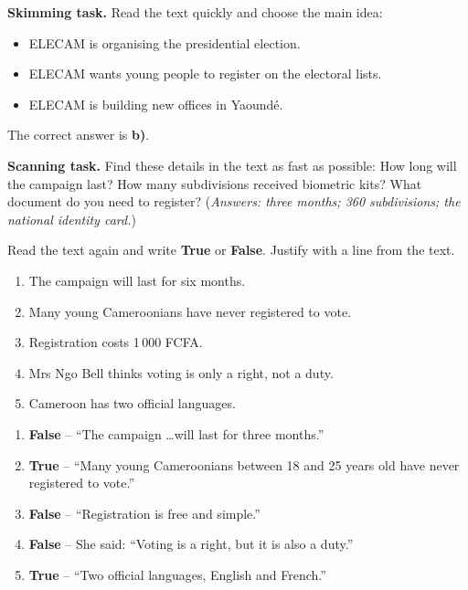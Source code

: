 \documentclass[11pt]{article}
\newcounter{popsec}
\newcounter{popsub}
\newcommand{\courssub}[1]{%
  \stepcounter{popsub}%
  \par\vspace{9pt}\noindent{\popxbold\fontsize{11.5}{13}\selectfont\color{popink}{\color{poporange}\thepopsec.\thepopsub}\hspace{6pt}#1}\par\nopagebreak\vspace{4pt}
}
\begin{document}
\textbf{Skimming task.} Read the text quickly and choose the main idea:
\begin{itemize}
\item[a)] ELECAM is organising the presidential election.
\item[b)] ELECAM wants young people to register on the electoral lists.
\item[c)] ELECAM is building new offices in Yaoundé.
\end{itemize}
The correct answer is \textbf{b)}.

\textbf{Scanning task.} Find these details in the text as fast as possible: How long will the campaign last? How many subdivisions received biometric kits? What document do you need to register? (\emph{Answers: three months; 360 subdivisions; the national identity card.})

\courssub{Comprehension Tasks}

\begin{exercice}
Read the text again and write \textbf{True} or \textbf{False}. Justify with a line from the text.
\begin{enumerate}
\item The campaign will last for six months.
\item Many young Cameroonians have never registered to vote.
\item Registration costs 1\,000 FCFA.
\item Mrs Ngo Bell thinks voting is only a right, not a duty.
\item Cameroon has two official languages.
\end{enumerate}
\end{exercice}

\begin{corrige}
\begin{enumerate}
\item \textbf{False} -- ``The campaign \ldots will last for three months.''
\item \textbf{True} -- ``Many young Cameroonians between 18 and 25 years old have never registered to vote.''
\item \textbf{False} -- ``Registration is free and simple.''
\item \textbf{False} -- She said: ``Voting is a right, but it is also a duty.''
\item \textbf{True} -- ``Two official languages, English and French.''
\end{enumerate}
\end{corrige}
\end{document}

